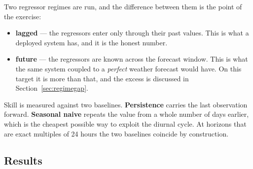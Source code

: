 \documentclass[11pt,a4paper]{article}
\begin{document}
Two regressor regimes are run, and the difference between them is the point of
the exercise:

\begin{itemize}
\item \textbf{lagged} --- the regressors enter only through their past values.
This is what a deployed system has, and it is the honest number.
\item \textbf{future} --- the regressors are known across the forecast window.
This is what the same system coupled to a \emph{perfect} weather forecast would
have. On this target it is more than that, and the excess is discussed in
Section~\ref{sec:regimegap}.
\end{itemize}

Skill is measured against two baselines. \textbf{Persistence} carries the last
observation forward. \textbf{Seasonal naive} repeats the value from a whole
number of days earlier, which is the cheapest possible way to exploit the diurnal
cycle. At horizons that are exact multiples of 24 hours the two baselines
coincide by construction.

\subsection{Results}
\end{document}

